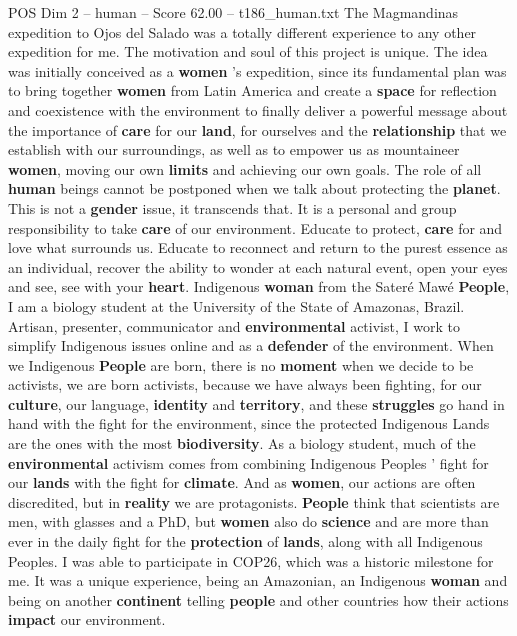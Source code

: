 \begin{textsample}{POS Dim 2 – human – Score 62.00 – t186\_human.txt}
The Magmandinas expedition to Ojos del Salado was a totally different experience to any other expedition for me.
The motivation and soul of this project is unique.
The idea was initially conceived as a \textbf{women} ’s expedition, since its fundamental plan was to bring together \textbf{women} from Latin America and create a \textbf{space} for reflection and coexistence with the environment to finally deliver a powerful message about the importance of \textbf{care} for our \textbf{land}, for ourselves and the \textbf{relationship} that we establish with our surroundings, as well as to empower us as mountaineer \textbf{women}, moving our own \textbf{limits} and achieving our own goals.
The role of all \textbf{human} beings cannot be postponed when we talk about protecting the \textbf{planet}.
This is not a \textbf{gender} issue, it transcends that.
It is a personal and group responsibility to take \textbf{care} of our environment.
Educate to protect, \textbf{care} for and love what surrounds us.
Educate to reconnect and return to the purest essence as an individual, recover the ability to wonder at each natural event, open your eyes and see, see with your \textbf{heart}.
Indigenous \textbf{woman} from the Sateré Mawé \textbf{People}, I am a biology student at the University of the State of Amazonas, Brazil.
Artisan, presenter, communicator and \textbf{environmental} activist, I work to simplify Indigenous issues online and as a \textbf{defender} of the environment.
When we Indigenous \textbf{People} are born, there is no \textbf{moment} when we decide to be activists, we are born activists, because we have always been fighting, for our \textbf{culture}, our language, \textbf{identity} and \textbf{territory}, and these \textbf{struggles} go hand in hand with the fight for the environment, since the protected Indigenous Lands are the ones with the most \textbf{biodiversity}.
As a biology student, much of the \textbf{environmental} activism comes from combining Indigenous Peoples ’ fight for our \textbf{lands} with the fight for \textbf{climate}.
And as \textbf{women}, our actions are often discredited, but in \textbf{reality} we are protagonists. \textbf{People} think that scientists are men, with glasses and a PhD, but \textbf{women} also do \textbf{science} and are more than ever in the daily fight for the \textbf{protection} of \textbf{lands}, along with all Indigenous Peoples.
I was able to participate in COP26, which was a historic milestone for me.
It was a unique experience, being an Amazonian, an Indigenous \textbf{woman} and being on another \textbf{continent} telling \textbf{people} and other countries how their actions \textbf{impact} our environment.

\end{textsample}
